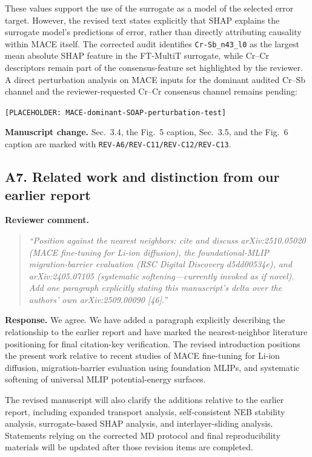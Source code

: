 \documentclass[11pt,a4paper]{article}
\begin{document}
These values support the use of the surrogate as a model of the selected error target. However, the revised text states explicitly that SHAP explains the surrogate model's predictions of error, rather than directly attributing causality within MACE itself. The corrected audit identifies \texttt{Cr-Sb\_n43\_l0} as the largest mean absolute SHAP feature in the FT-MultiT surrogate, while Cr--Cr descriptors remain part of the consensus-feature set highlighted by the reviewer. A direct perturbation analysis on MACE inputs for the dominant audited Cr--Sb channel and the reviewer-requested Cr--Cr consensus channel remains pending:

\begin{center}
\texttt{[PLACEHOLDER: MACE-dominant-SOAP-perturbation-test]}
\end{center}

\noindent\textbf{Manuscript change.}
Sec.~3.4, the Fig.~5 caption, Sec.~3.5, and the Fig.~6 caption are marked with \texttt{REV-A6/REV-C11/REV-C12/REV-C13}.

\subsection*{A7. Related work and distinction from our earlier report}

\noindent\textbf{Reviewer comment.}
\begin{quote}
\itshape
``Position against the nearest neighbors: cite and discuss arXiv:2510.05020 (MACE fine-tuning for Li-ion diffusion), the foundational-MLIP migration-barrier evaluation (RSC Digital Discovery d5dd00534e), and arXiv:2405.07105 (systematic softening---currently invoked as if novel). Add one paragraph explicitly stating this manuscript's delta over the authors' own arXiv:2509.00090 [46].''
\end{quote}

\noindent\textbf{Response.}
We agree. We have added a paragraph explicitly describing the relationship to the earlier report and have marked the nearest-neighbor literature positioning for final citation-key verification. The revised introduction positions the present work relative to recent studies of MACE fine-tuning for Li-ion diffusion, migration-barrier evaluation using foundation MLIPs, and systematic softening of universal MLIP potential-energy surfaces.

The revised manuscript will also clarify the additions relative to the earlier report, including expanded transport analysis, self-consistent NEB stability analysis, surrogate-based SHAP analysis, and interlayer-sliding analysis. Statements relying on the corrected MD protocol and final reproducibility materials will be updated after those revision items are completed.
\end{document}
